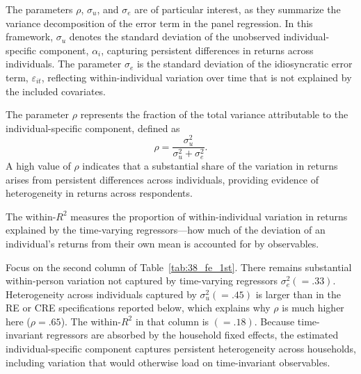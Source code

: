 \begin{table}[H]
\centering
\caption{\textbf{Panel OLS with Individual Fixed Effects}}
\label{tab:38_fe_1st}
\begin{threeparttable}
\begingroup
\setlength{\tabcolsep}{3pt}%
\renewcommand{\arraystretch}{0.70}%
\small%
\resizebox{\textwidth}{!}{%
%
}%
\endgroup
\begin{tablenotes}[flushleft]
\footnotesize
\item {}%
\end{tablenotes}
\end{threeparttable}
\end{table}


\par The parameters $\rho$, $\sigma_u$, and $\sigma_e$ are of particular interest, as they summarize the variance decomposition of the error term in the panel regression. In this framework, $\sigma_u$ denotes the standard deviation of the unobserved individual-specific component, $\alpha_i$, capturing persistent differences in returns across individuals. The parameter $\sigma_e$ is the standard deviation of the idiosyncratic error term, $\varepsilon_{it}$, reflecting within-individual variation over time that is not explained by the included covariates.

\par The parameter $\rho$ represents the fraction of the total variance attributable to the individual-specific component, defined as
\[
\rho = \frac{\sigma_u^2}{\sigma_u^2 + \sigma_e^2}.
\]
A high value of $\rho$ indicates that a substantial share of the variation in returns arises from persistent differences across individuals, providing evidence of heterogeneity in returns across respondents.

\par The within-$R^2$ measures the proportion of within-individual variation in returns explained by the time-varying regressors---how much of the deviation of an individual's returns from their own mean is accounted for by observables.

\par Focus on the second column of Table~\ref{tab:38_fe_1st}. There remains substantial within-person variation not captured by time-varying regressors $\sigma_e^2(=.33)$. Heterogeneity across individuals captured by $\sigma_u^2(=.45)$ is larger than in the RE or CRE specifications reported below, which explains why $\rho$ is much higher here ($\rho=.65$). The within-$R^2$ in that column is $(=.18)$. Because time-invariant regressors are absorbed by the household fixed effects, the estimated individual-specific component captures persistent heterogeneity across households, including variation that would otherwise load on time-invariant observables.

